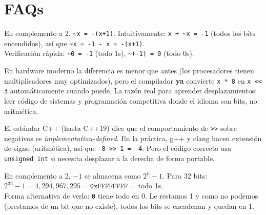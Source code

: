 \documentclass[12pt, oneside]{article}
\begin{document}
\section{FAQs}

\begin{notaprofesor}[¿Por qué \texttt{\textasciitilde 30 = -31}?]
  En complemento a 2, \texttt{\textasciitilde x = -(x+1)}.
  Intuitivamente: \texttt{x + \textasciitilde x = -1} (todos los bits
  encendidos), así que \texttt{\textasciitilde x = -1 - x = -(x+1)}.\\[4pt]
  Verificación rápida: \texttt{\textasciitilde 0 = -1} (todo 1s),
  \texttt{\textasciitilde(-1) = 0} (todo 0s).
\end{notaprofesor}

\begin{notaprofesor}
  En hardware moderno la diferencia es menor que antes (los procesadores
  tienen multiplicadores muy optimizados), pero el compilador \textbf{ya}
  convierte \texttt{x * 8} en \texttt{x << 3} automáticamente cuando puede.
  La razón real para aprender desplazamientos: leer código de sistemas y
  programación competitiva donde el idioma son bits, no aritmética.
\end{notaprofesor}

\begin{notaprofesor}
  El estándar C++ (hasta C++19) dice que el comportamiento de \texttt{>>}
  sobre negativos es \textit{implementation-defined}. En la práctica, g++
  y clang hacen extensión de signo (aritmética), así que \texttt{-8 >> 1 = -4}.
  Pero el código correcto usa \texttt{unsigned int} si necesita desplazar
  a la derecha de forma portable.
\end{notaprofesor}

\begin{notaprofesor}
  En complemento a 2, $-1$ se almacena como $2^n - 1$. Para 32 bits:
  $2^{32} - 1 = 4{,}294{,}967{,}295 = \texttt{0xFFFFFFFF}$ = todo 1s.\\[4pt]
  Forma alternativa de verlo: \texttt{0} tiene todo en 0. Le restamos 1
  y como no podemos (prestamos de un bit que no existe), todos los bits
  se encadenan y quedan en 1.
\end{notaprofesor}
\end{document}
